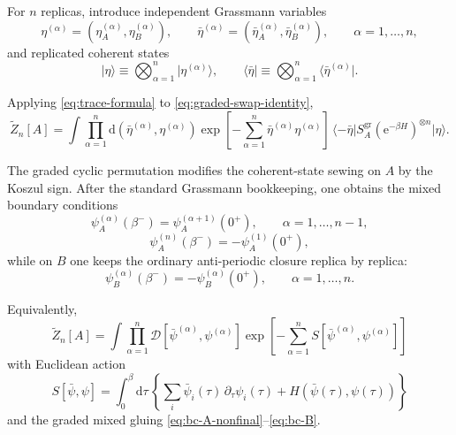 \documentclass[11pt]{article}
\newcommand{\e}{\mathrm{e}}
\newcommand{\dd}{\mathrm{d}}
\newcommand{\1}{\mathds{1}}
\newcommand{\cD}{\mathcal{D}}
\newcommand{\br}[1]{\left(#1\right)}
\newcommand{\sq}[1]{\left[#1\right]}
\newcommand{\cb}[1]{\left\{#1\right\}}
\begin{document}
For $n$ replicas, introduce independent Grassmann variables
\begin{equation}
\eta^{(\alpha)}=(\eta_A^{(\alpha)},\eta_B^{(\alpha)}),
\qquad
\bar\eta^{(\alpha)}=(\bar\eta_A^{(\alpha)},\bar\eta_B^{(\alpha)}),
\qquad
\alpha=1,\dots,n,
\label{eq:replica-grassmann}
\end{equation}
and replicated coherent states
\begin{equation}
\lvert \eta\rangle
\equiv \bigotimes_{\alpha=1}^n \lvert \eta^{(\alpha)}\rangle,
\qquad
\langle \bar\eta\rvert
\equiv \bigotimes_{\alpha=1}^n \langle \bar\eta^{(\alpha)}\rvert.
\label{eq:replica-coherent}
\end{equation}

Applying \eqref{eq:trace-formula} to \eqref{eq:graded-swap-identity},
\begin{equation}
\widetilde Z_n[A]
=
\int \prod_{\alpha=1}^n \dd\br{\bar\eta^{(\alpha)},\eta^{(\alpha)}}
\exp\sq{-\sum_{\alpha=1}^n \bar\eta^{(\alpha)}\eta^{(\alpha)}}
\,
\langle -\bar\eta\rvert S_A^{\mathrm{gr}}
\br{\e^{-\beta H}}^{\otimes n}\rvert \eta\rangle.
\label{eq:Zn-before-path-int}
\end{equation}

The graded cyclic permutation modifies the coherent-state sewing on $A$ by the
Koszul sign. After the standard Grassmann bookkeeping, one obtains the mixed
boundary conditions
\begin{equation}
\psi_A^{(\alpha)}(\beta^-)=\psi_A^{(\alpha+1)}(0^+),
\qquad
\alpha=1,\dots,n-1,
\label{eq:bc-A-nonfinal}
\end{equation}
\begin{equation}
\psi_A^{(n)}(\beta^-)=-\psi_A^{(1)}(0^+),
\label{eq:bc-A-final}
\end{equation}
while on $B$ one keeps the ordinary anti-periodic closure replica by replica:
\begin{equation}
\psi_B^{(\alpha)}(\beta^-)
=
-\psi_B^{(\alpha)}(0^+),
\qquad
\alpha=1,\dots,n.
\label{eq:bc-B}
\end{equation}

Equivalently,
\begin{equation}
\widetilde Z_n[A]
=
\int \prod_{\alpha=1}^n \cD[\bar\psi^{(\alpha)},\psi^{(\alpha)}]
\exp\sq{-\sum_{\alpha=1}^n S[\bar\psi^{(\alpha)},\psi^{(\alpha)}]}
\label{eq:Zn-path-integral}
\end{equation}
with Euclidean action
\begin{equation}
S[\bar\psi,\psi]
=
\int_0^\beta \dd\tau\,
\cb{
\sum_i \bar\psi_i(\tau)\,\partial_\tau\psi_i(\tau)
+
H\br{\bar\psi(\tau),\psi(\tau)}
}
\label{eq:euclidean-action}
\end{equation}
and the graded mixed gluing \eqref{eq:bc-A-nonfinal}--\eqref{eq:bc-B}.
\end{document}
